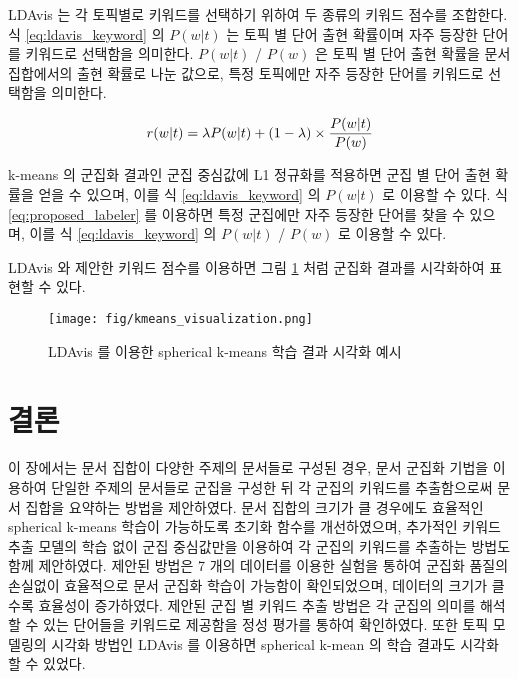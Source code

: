 \documentclass[oneside, ko,phd]{snuthesis_utf8_kor}
\begin{document}
LDAvis 는 각 토픽별로 키워드를 선택하기 위하여 두 종류의 키워드 점수를 조합한다.
식 \ref{eq:ldavis_keyword} 의 $P(w \vert t)$ 는 토픽 별 단어 출현 확률이며 자주 등장한 단어를 키워드로 선택함을 의미한다.
$P(w \vert t)$ / $P(w)$ 은 토픽 별 단어 출현 확률을 문서 집합에서의 출현 확률로 나눈 값으로, 특정 토픽에만 자주 등장한 단어를 키워드로 선택함을 의미한다.

\begin{equation}
\label{eq:ldavis_keyword}
\centering
r(w \vert t) = \lambda P(w \vert t) + (1 - \lambda) \times \frac{P(w \vert t)}{P(w)}
\end{equation}

k-means 의 군집화 결과인 군집 중심값에 L1 정규화를 적용하면 군집 별 단어 출현 확률을 얻을 수 있으며, 이를 식 \ref{eq:ldavis_keyword} 의 $P(w \vert t)$ 로 이용할 수 있다.
식 \ref{eq:proposed_labeler} 를 이용하면 특정 군집에만 자주 등장한 단어를 찾을 수 있으며, 이를 식 \ref{eq:ldavis_keyword} 의 $P(w \vert t)$ / $P(w)$ 로 이용할 수 있다.

LDAvis 와 제안한 키워드 점수를 이용하면 그림 \ref{fig:kmeans_ldavis} 처럼 군집화 결과를 시각화하여 표현할 수 있다.

\begin{figure}[H]
\centering
\texttt{[image: fig/kmeans\_visualization.png]}
\caption{LDAvis 를 이용한 spherical k-means 학습 결과 시각화 예시}
\label{fig:kmeans_ldavis}
\end{figure}


\section{결론}

이 장에서는 문서 집합이 다양한 주제의 문서들로 구성된 경우, 문서 군집화 기법을 이용하여 단일한 주제의 문서들로 군집을 구성한 뒤 각 군집의 키워드를 추출함으로써 문서 집합을 요약하는 방법을 제안하였다.
문서 집합의 크기가 클 경우에도 효율적인 spherical k-means 학습이 가능하도록 초기화 함수를 개선하였으며, 추가적인 키워드 추출 모델의 학습 없이 군집 중심값만을 이용하여 각 군집의 키워드를 추출하는 방법도 함께 제안하였다.
제안된 방법은 7 개의 데이터를 이용한 실험을 통하여 군집화 품질의 손실없이 효율적으로 문서 군집화 학습이 가능함이 확인되었으며, 데이터의 크기가 클수록 효율성이 증가하였다.
제안된 군집 별 키워드 추출 방법은 각 군집의 의미를 해석할 수 있는 단어들을 키워드로 제공함을 정성 평가를 통하여 확인하였다.
또한 토픽 모델링의 시각화 방법인 LDAvis 를 이용하면 spherical k-mean 의 학습 결과도 시각화 할 수 있었다.
\end{document}
